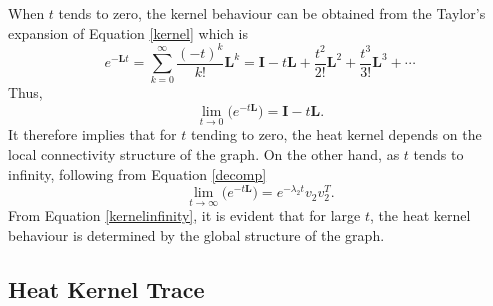 \documentclass[10pt,a4paper]{article}
\begin{document}
        When $t$ tends to zero, the kernel behaviour can be obtained from the Taylor's expansion of  Equation \ref{kernel} which is 
        \begin{equation}
        e^{-\mathbf{L}t} = \sum_{k=0}^{\infty} \frac{(-t)^k}{k!} \mathbf{L}^k = \mathbf{I} -t \mathbf{L} + \frac{ t^2}{2!}\mathbf{L}^2 + \frac{ t^3 }{3!}\mathbf{L}^3 + \cdots
        \end{equation}
        Thus,
        \begin{equation}
        \lim_{t\longrightarrow 0} \Big(e^{-t\mathbf{L}}\Big) = \mathbf{I} - t\mathbf{L}.
        \label{kerneltozero}
        \end{equation}
        It therefore implies that for $t$ tending to zero, the heat kernel depends on the local connectivity structure of the graph.
        On the other hand, as $t$ tends to infinity, following from Equation \ref{decomp}
        \begin{equation}
        \lim_{t\longrightarrow \infty} \Big(e^{-t\mathbf{L}}\Big) = e^{-\lambda_2 t} v_2 v _2^T.
        \label{kernelinfinity}  
        \end{equation}
        From Equation \ref{kernelinfinity}, it is evident that for large $t$, the heat kernel behaviour is determined by the global structure of the graph. 
        
        \subsection{Heat Kernel Trace}
        
\end{document}
